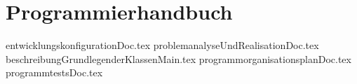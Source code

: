 \part{Programmierhandbuch}
{entwicklungskonfigurationDoc.tex}
\clearpage
{problemanalyseUndRealisationDoc.tex}
\clearpage
{beschreibungGrundlegenderKlassenMain.tex}
\clearpage
{programmorganisationsplanDoc.tex}
\clearpage
{programmtestsDoc.tex}